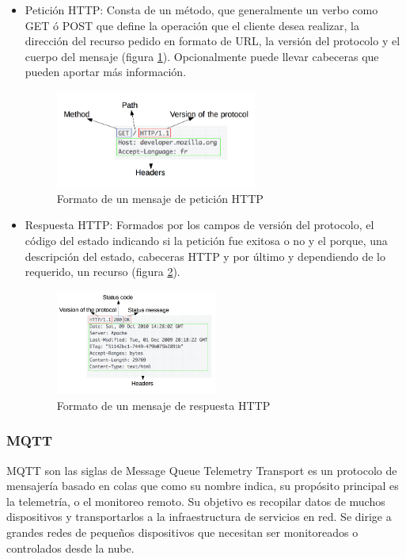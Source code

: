\begin{itemize}
\item Petición HTTP: Consta de un método, que generalmente un verbo como GET ó POST que define la operación que el cliente desea realizar, la dirección del recurso pedido en formato de URL, la versión del protocolo y el cuerpo del mensaje (figura \ref{fig:httprequest}). Opcionalmente puede llevar cabeceras que pueden aportar más información. 

\begin{figure}[!htb]
\centering
\includegraphics[width=0.625\textwidth]{Figuras/HTTP_Request.png}
\caption{\label{fig:httprequest}Formato de un mensaje de petición HTTP}
\vspace*{-15pt}
\end{figure}

\item Respuesta HTTP: Formados por los campos de versión del protocolo, el código del estado indicando si la petición fue exitosa o no y el porque, una descripción del estado, cabeceras HTTP y por último y dependiendo de lo requerido, un recurso (figura \ref{fig:httpresponse}).\\

\begin{figure}[!htb]
\centering
\includegraphics[width=0.5\textwidth]{Figuras/HTTP_Response.png}
\caption{\label{fig:httpresponse}Formato de un mensaje de respuesta HTTP}
\vspace*{-15pt}
\end{figure}
\end{itemize}

\subsubsection{MQTT}
MQTT son las siglas de Message Queue Telemetry Transport\cite{rfc9431} es un protocolo de mensajería basado en colas que como su nombre indica, su propósito principal es la telemetría, o el monitoreo remoto. Su objetivo es recopilar datos de muchos dispositivos y transportarlos a la infraestructura de servicios en red. Se dirige a grandes redes de pequeños dispositivos que necesitan ser monitoreados o controlados desde la nube.\cite{iotprotocols}\\

